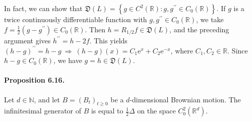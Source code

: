 \documentclass{article}
\numberwithin{equation}{section}
\newcommand{\e}{\mathrm{e}}
\theoremstyle{plain}
\theoremstyle{definition}
\begin{document}
In fact, we can show that $\mathfrak{D}(L)=\left\{g\in C^2(\mathbb{R}): g,g^{\prime\prime}\in C_0(\mathbb{R})\right\}$. If $g$ is a twice continuously differentiable function with $g,g^{\prime\prime}\in C_0(\mathbb{R})$, we take $f=\frac{1}{2}(g-g^{\prime\prime})\in C_0(\mathbb{R})$. Then $h=R_{1/2}f\in\mathfrak{D}(L)$, and the preceding argument gives $h^{\prime\prime}=h-2f$. This yields $(h-g)^{\prime\prime}=h-g\ \Rightarrow\ (h-g)(x)=C_1\e^x+C_2\e^{-x}$, where $C_1,C_2\in\mathbb{R}$. Since $h-g\in C_0(\mathbb{R})$, we have $g=h\in\mathfrak{D}(L)$.

\paragraph{Proposition 6.16.\label{prop:6.16}} Let $d\in\mathbb{N}$, and let $B=(B_t)_{t\geq 0}$ be a $d$-dimensional Brownian motion. The infinitesimal generator of $B$ is equal to $\frac{1}{2}\Delta$ on the space $C_0^2(\mathbb{R}^d)$.
\end{document}
